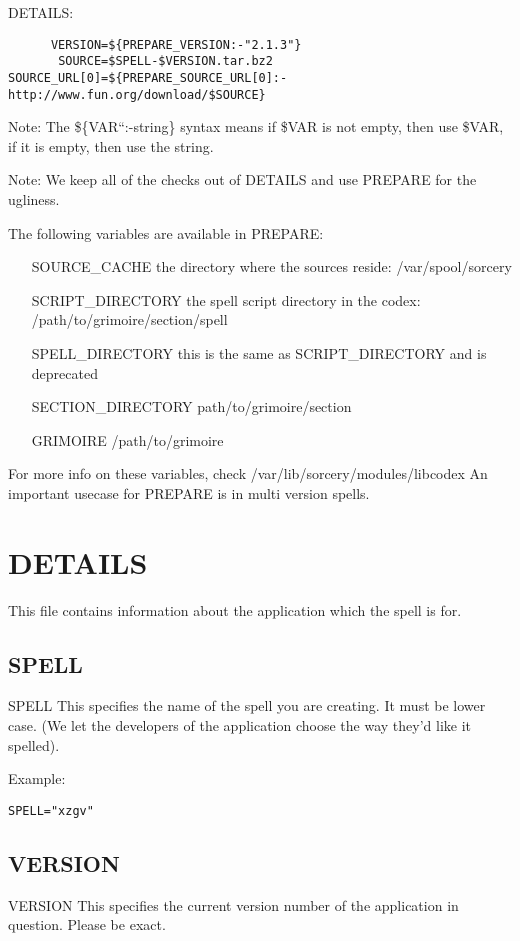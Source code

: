 \documentclass[a4paper,10pt]{book}
\begin{document}
DETAILS:
\begin{verbatim}
      VERSION=${PREPARE_VERSION:-"2.1.3"}
       SOURCE=$SPELL-$VERSION.tar.bz2
SOURCE_URL[0]=${PREPARE_SOURCE_URL[0]:-http://www.fun.org/download/$SOURCE}
\end{verbatim}

Note: The \$\{VAR``:-string\}  syntax means if \$VAR is not empty, then use
\$VAR, if it is empty, then use the string.

Note: We keep all of the checks out of DETAILS and use PREPARE for the
ugliness.

The following variables are available in PREPARE:
\begin{itemize}
\item[SOURCE\_CACHE] the directory where the sources reside:
/var/spool/sorcery
\item[SCRIPT\_DIRECTORY] the spell script directory in the codex:
/path/to/grimoire/section/spell
\item[SPELL\_DIRECTORY] this is the same as \textdollar SCRIPT\_DIRECTORY and
is deprecated
\item[SECTION\_DIRECTORY] path/to/grimoire/section
\item[GRIMOIRE] /path/to/grimoire
\end{itemize}

For more info on these variables, check /var/lib/sorcery/modules/libcodex
An important usecase for PREPARE is in multi version spells.

\section{DETAILS}
This file contains information about the application which the spell is for.
\subsection{SPELL}
SPELL
	This specifies the name of the spell you are creating. It must be
	lower case. (We let the developers of the application choose the way
	they'd like it spelled).

Example:
\begin{verbatim}
SPELL="xzgv"
\end{verbatim}

\subsection{VERSION}
VERSION
	This specifies the current version number of the application in
	question. Please be exact.
\end{document}
